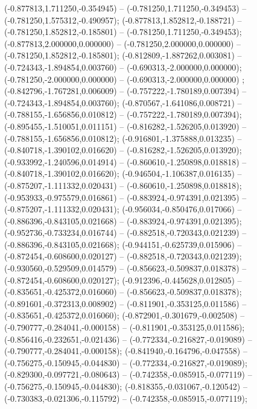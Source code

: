  (-0.877813,1.711250,-0.354945) -- (-0.781250,1.711250,-0.349453) -- (-0.781250,1.575312,-0.490957);
 (-0.877813,1.852812,-0.188721) -- (-0.781250,1.852812,-0.185801) -- (-0.781250,1.711250,-0.349453);
 (-0.877813,2.000000,0.000000) -- (-0.781250,2.000000,0.000000) -- (-0.781250,1.852812,-0.185801);
 (-0.812809,-1.887262,0.003081) -- (-0.724343,-1.894854,0.003760) -- (-0.690313,-2.000000,0.000000);
 (-0.781250,-2.000000,0.000000) -- (-0.690313,-2.000000,0.000000) ;
 (-0.842796,-1.767281,0.006009) -- (-0.757222,-1.780189,0.007394) -- (-0.724343,-1.894854,0.003760);
 (-0.870567,-1.641086,0.008721) -- (-0.788155,-1.656856,0.010812) -- (-0.757222,-1.780189,0.007394);
 (-0.895455,-1.510051,0.011151) -- (-0.816282,-1.526205,0.013920) -- (-0.788155,-1.656856,0.010812);
 (-0.916801,-1.375888,0.013235) -- (-0.840718,-1.390102,0.016620) -- (-0.816282,-1.526205,0.013920);
 (-0.933992,-1.240596,0.014914) -- (-0.860610,-1.250898,0.018818) -- (-0.840718,-1.390102,0.016620);
 (-0.946504,-1.106387,0.016135) -- (-0.875207,-1.111332,0.020431) -- (-0.860610,-1.250898,0.018818);
 (-0.953933,-0.975579,0.016861) -- (-0.883924,-0.974391,0.021395) -- (-0.875207,-1.111332,0.020431);
 (-0.956034,-0.850476,0.017066) -- (-0.886396,-0.843105,0.021668) -- (-0.883924,-0.974391,0.021395);
 (-0.952736,-0.733234,0.016744) -- (-0.882518,-0.720343,0.021239) -- (-0.886396,-0.843105,0.021668);
 (-0.944151,-0.625739,0.015906) -- (-0.872454,-0.608600,0.020127) -- (-0.882518,-0.720343,0.021239);
 (-0.930560,-0.529509,0.014579) -- (-0.856623,-0.509837,0.018378) -- (-0.872454,-0.608600,0.020127);
 (-0.912396,-0.445628,0.012805) -- (-0.835651,-0.425372,0.016060) -- (-0.856623,-0.509837,0.018378);
 (-0.891601,-0.372313,0.008902) -- (-0.811901,-0.353125,0.011586) -- (-0.835651,-0.425372,0.016060);
 (-0.872901,-0.301679,-0.002508) -- (-0.790777,-0.284041,-0.000158) -- (-0.811901,-0.353125,0.011586);
 (-0.856416,-0.232651,-0.021436) -- (-0.772334,-0.216827,-0.019089) -- (-0.790777,-0.284041,-0.000158);
 (-0.841940,-0.164796,-0.047558) -- (-0.756275,-0.150945,-0.044830) -- (-0.772334,-0.216827,-0.019089);
 (-0.829300,-0.097721,-0.080643) -- (-0.742358,-0.085915,-0.077119) -- (-0.756275,-0.150945,-0.044830);
 (-0.818355,-0.031067,-0.120542) -- (-0.730383,-0.021306,-0.115792) -- (-0.742358,-0.085915,-0.077119);
